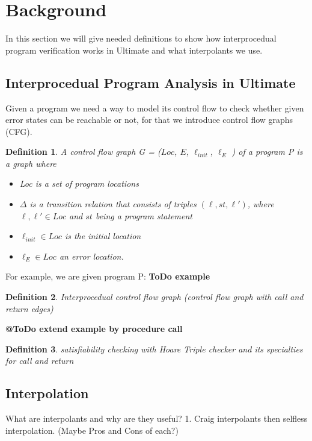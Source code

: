 \documentclass{article}
\newtheorem{mydef}{Definition}
\begin{document}
	\section{Background}
	In this section we will give needed definitions to show how interprocedual program verification works in Ultimate and what interpolants we use.
	\subsection{Interprocedual Program Analysis in Ultimate}	
	Given a program we need a way to model its control flow to check whether given error states can be reachable or not, for that we introduce control flow graphs (CFG).
	
	\begin{mydef}
		A control flow graph G = ($Loc$, $E$, $\ell_{init}$, $\ell_E$ ) of a program P is a graph where
		\begin{itemize}
			\item  Loc is a set of program locations
			\item $\Delta$ is a transition relation that consists of triples $(\ell, st, \ell')$, where $\ell, \ell' \in Loc$ and $st$ being a program statement
			\item $\ell_{init} \in Loc$ is the initial location
			\item $\ell_E \in Loc$ an error location.
		\end{itemize}

	\end{mydef} \noindent
	For example, we are given program P: \textbf{ToDo example}
	
	\begin{mydef}
		Interprocedual control flow graph
		(control flow graph with call and return edges)
	\end{mydef}
	\textbf{@ToDo extend example by procedure call}
	
	\begin{mydef}
		satisfiability checking with Hoare Triple checker and its specialties for call and return
	\end{mydef}
	
	
	\pagebreak
		
	\subsection{Interpolation}
	What are interpolants and why are they useful? 1. Craig interpolants then selfless interpolation.
	(Maybe Pros and Cons of each?)
	
\end{document}

